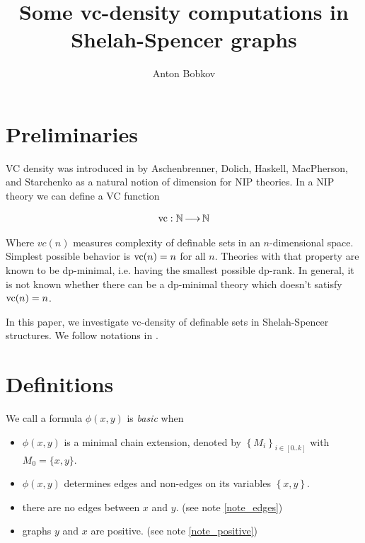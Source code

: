 \documentclass{amsart}
\title{Some vc-density computations in Shelah-Spencer graphs}
\author{Anton Bobkov}
\newcommand{\curly}[1]{\left\{#1\right\}}
\begin{document}
\maketitle

\section{Preliminaries}

VC density was introduced in \cite{vc_density} by Aschenbrenner, Dolich, Haskell, MacPherson, and Starchenko as a natural notion of dimension for NIP theories. In a NIP theory we can define a VC function

\begin{align*}
	\operatorname{vc} : \mathbb{N} \operatorname{\longrightarrow} \mathbb{N}
\end{align*}

Where $vc(n)$ measures complexity of definable sets in an $n$-dimensional space. Simplest possible behavior is $\operatorname{vc}(n) = n$ for all $n$. Theories with that property are known to be dp-minimal, i.e. having the smallest possible dp-rank. In general, it is not known whether there can be a dp-minimal theory which doesn't satisfy $\operatorname{vc}(n)=n$.

In this paper, we investigate vc-density of definable sets in Shelah-Spencer structures. We follow notations in \cite{laskowski}.

\section{Definitions}

\begin{Definition}
	We call a formula $\phi(x, y)$ is \emph{basic} when
	\begin{itemize}
		\item $\phi(x, y)$ is a minimal chain extension, denoted by $\curly{M_i}_{i \in [0..k]}$ with $M_0 = \{x, y\}$.
		\item $\phi(x, y)$ determines edges and non-edges on its variables $\curly{x, y}$.
		\item there are no edges between $x$ and $y$. (see note \ref{note_edges})
		\item graphs $y$ and $x$ are positive. (see note \ref{note_positive})
	\end{itemize}
\end{Definition}
\end{document}
